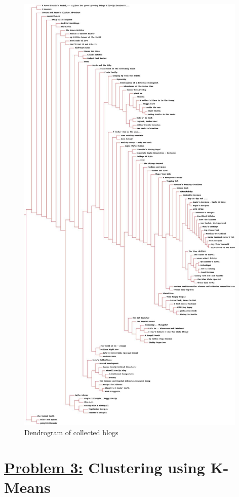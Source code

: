 \documentclass{article}
\begin{document}
\begin{figure}[H]
 \centering
 	\includegraphics[height=22cm]{clusters.jpg}
  \caption{Dendrogram of collected blogs}
\end{figure}


\section*{{\underline{\huge {Problem 3:}} Clustering using K-Means }}
\end{document}
